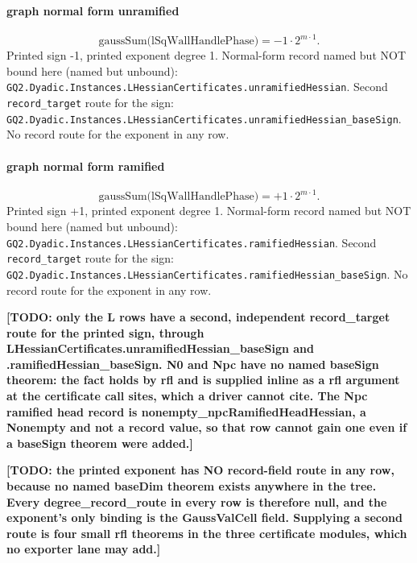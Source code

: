 \paragraph{graph normal form unramified}
\[\mathrm{gaussSum}\bigl(\mathrm{lSqWallHandlePhase}\bigr)=-1\cdot 2^{m\cdot 1}.\]
Printed sign -1, printed exponent degree 1. Normal-form record named but NOT bound here (named but unbound): \texttt{GQ2.Dyadic.Instances.LHessianCertificates.unramifiedHessian}.
Second \texttt{record\_target} route for the sign: \texttt{GQ2.Dyadic.Instances.LHessianCertificates.unramifiedHessian\_baseSign}. No record route for the exponent in any row.
\paragraph{graph normal form ramified}
\[\mathrm{gaussSum}\bigl(\mathrm{lSqWallHandlePhase}\bigr)=+1\cdot 2^{m\cdot 1}.\]
Printed sign +1, printed exponent degree 1. Normal-form record named but NOT bound here (named but unbound): \texttt{GQ2.Dyadic.Instances.LHessianCertificates.ramifiedHessian}.
Second \texttt{record\_target} route for the sign: \texttt{GQ2.Dyadic.Instances.LHessianCertificates.ramifiedHessian\_baseSign}. No record route for the exponent in any row.
\par\noindent\textbf{[TODO: only the L rows have a second, independent record\_target route for the printed sign, through LHessianCertificates.unramifiedHessian\_baseSign and .ramifiedHessian\_baseSign. N0 and Npc have no named baseSign theorem: the fact holds by rfl and is supplied inline as a rfl argument at the certificate call sites, which a driver cannot cite. The Npc ramified head record is nonempty\_npcRamifiedHeadHessian, a Nonempty and not a record value, so that row cannot gain one even if a baseSign theorem were added.]}
\par\noindent\textbf{[TODO: the printed exponent has NO record-field route in any row, because no named baseDim theorem exists anywhere in the tree. Every degree\_record\_route in every row is therefore null, and the exponent's only binding is the GaussValCell field. Supplying a second route is four small rfl theorems in the three certificate modules, which no exporter lane may add.]}
